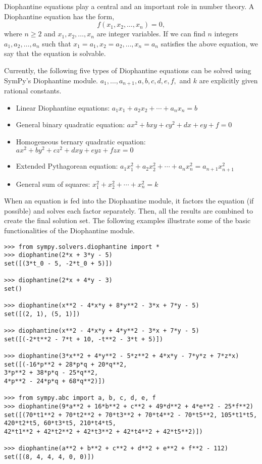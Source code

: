 Diophantine equations play a central and an important role in number theory.  A
Diophantine equation has the form, $$f(x_1, x_2, \dotsc, x_n) = 0,$$ where $n \geq
2$ and $x_1, x_2, \dotsc, x_n$ are integer variables. If we can find $n$
integers $a_1, a_2, \dotsc, a_n$ such that $x_1 = a_1, x_2 = a_2, \dotsc, x_n =
a_n$ satisfies the above equation, we say that the equation is solvable.

Currently, the following five types of Diophantine equations can be solved using
SymPy's Diophantine module. $a_1, \ldots, a_{n+1}, a, b, c, d, e,
f,$ and $k$ are explicitly given rational constants.

\begin{itemize}
    \item Linear Diophantine equations: $a_1x_1 + a_2x_2 + \dotsb{} + a_{n}x_{n} = b$
    \item General binary quadratic equation: $ax^2 + bxy + cy^2 + dx + ey + f = 0$
    \item Homogeneous ternary quadratic equation: $ax^2 + by^2 + cz^2 + dxy + eyz + fzx = 0$
    \item Extended Pythagorean equation: $a_{1}x_{1}^2 + a_{2}x_{2}^2 + \dotsb{} + a_{n}x_{n}^2 = a_{n+1}x_{n+1}^2$
    \item General sum of squares: $x_{1}^2 + x_{2}^2 + \dotsb{} + x_{n}^2 = k$
\end{itemize}

When an equation is fed into the Diophantine module, it factors the equation (if
possible) and solves each factor separately. Then, all the results are combined
to create the final solution set. The following examples illustrate some of the
basic functionalities of the Diophantine module.

\begin{verbatim}
>>> from sympy.solvers.diophantine import *
>>> diophantine(2*x + 3*y - 5)
set([(3*t_0 - 5, -2*t_0 + 5)])

>>> diophantine(2*x + 4*y - 3)
set()

>>> diophantine(x**2 - 4*x*y + 8*y**2 - 3*x + 7*y - 5)
set([(2, 1), (5, 1)])

>>> diophantine(x**2 - 4*x*y + 4*y**2 - 3*x + 7*y - 5)
set([(-2*t**2 - 7*t + 10, -t**2 - 3*t + 5)])

>>> diophantine(3*x**2 + 4*y**2 - 5*z**2 + 4*x*y - 7*y*z + 7*z*x)
set([(-16*p**2 + 28*p*q + 20*q**2,
3*p**2 + 38*p*q - 25*q**2,
4*p**2 - 24*p*q + 68*q**2)])

>>> from sympy.abc import a, b, c, d, e, f
>>> diophantine(9*a**2 + 16*b**2 + c**2 + 49*d**2 + 4*e**2 - 25*f**2)
set([(70*t1**2 + 70*t2**2 + 70*t3**2 + 70*t4**2 - 70*t5**2, 105*t1*t5,
420*t2*t5, 60*t3*t5, 210*t4*t5,
42*t1**2 + 42*t2**2 + 42*t3**2 + 42*t4**2 + 42*t5**2)])

>>> diophantine(a**2 + b**2 + c**2 + d**2 + e**2 + f**2 - 112)
set([(8, 4, 4, 4, 0, 0)])
\end{verbatim}
